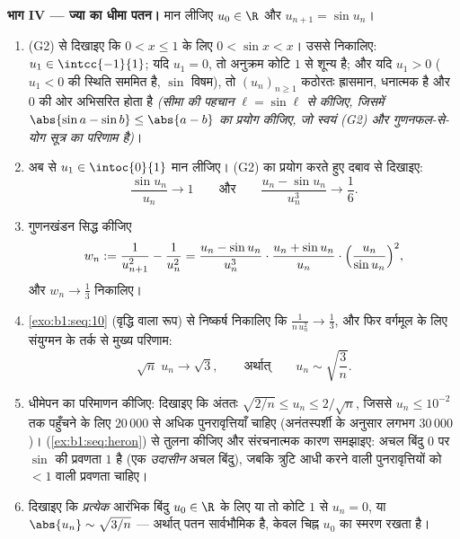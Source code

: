 \begin{problem}[{सप्ताहांत समस्या --- चेज़ारो--स्टोल्ज़ प्रमेय और $u_{n+1} = \sin
u_n$ के लिए अनंतस्पर्शी
$u_n \sim \sqrt{3/n}$}]
\medskip \noindent\textbf{भाग IV --- ज्या का धीमा पतन।} मान लीजिए $u_0 \in
\R$ और $u_{n+1} = \sin u_n$।
\begin{enumerate}[resume]
  \item (G2) से दिखाइए कि $0 < x \leq 1$ के लिए $0 < \sin x < x$। उससे
  निकालिए: $u_1 \in \intcc{-1}{1}$; यदि $u_1 = 0$, तो अनुक्रम कोटि $1$ से
  शून्य है; और यदि $u_1 > 0$ ($u_1 < 0$ की स्थिति सममित है, $\sin$ विषम), तो
  $(u_n)_{n \geq 1}$ कठोरतः ह्रासमान, धनात्मक है और $0$ की ओर अभिसरित होता
  है \emph{(सीमा की पहचान $\ell = \sin \ell$ से कीजिए, जिसमें $\abs{\sin a -
  \sin b} \leq \abs{a - b}$ का प्रयोग कीजिए, जो स्वयं (G2) और गुणनफल-से-योग
  सूत्र का परिणाम है)}।
  \item अब से $u_1 \in \intoc{0}{1}$ मान लीजिए। (G2) का प्रयोग करते हुए दबाव
  से दिखाइए:
        \[
        \frac{\sin u_n}{u_n} \to 1
        \qquad\text{और}\qquad
        \frac{u_n - \sin u_n}{u_n^{3}} \to \frac16 .
        \]
  \item गुणनखंडन सिद्ध कीजिए
        \[
        w_n := \frac{1}{u_{n+1}^{2}} - \frac{1}{u_n^{2}}
        = \frac{u_n - \sin u_n}{u_n^{3}} \cdot
        \frac{u_n + \sin u_n}{u_n} \cdot
        \Bigl(\frac{u_n}{\sin u_n}\Bigr)^{2},
        \]
        और $w_n \to \frac13$ निकालिए।
  \item \cref{exo:b1:seq:10} (वृद्धि वाला रूप) से निष्कर्ष निकालिए कि
  $\frac{1}{n\,u_n^{2}} \to \frac13$, और फिर वर्गमूल के लिए संयुग्मन के तर्क
  से मुख्य परिणाम:
        \[
        \sqrt n\;u_n \longrightarrow \sqrt 3 ,
        \qquad\text{अर्थात्}\qquad
        u_n \sim \sqrt{\frac 3n} .
        \]
  \item धीमेपन का परिमाणन कीजिए: दिखाइए कि अंततः $\sqrt{2/n} \leq u_n \leq
  2/\sqrt n$, जिससे $u_n \leq 10^{-2}$ तक पहुँचने के लिए $20\,000$ से अधिक
  पुनरावृत्तियाँ चाहिए (अनंतस्पर्शी के अनुसार लगभग $30\,000$)। 
  (\cref{ex:b1:seq:heron}) से तुलना कीजिए और संरचनात्मक कारण समझाइए: अचल
  बिंदु $0$ पर $\sin$ की प्रवणता $1$ है (एक \emph{उदासीन} अचल बिंदु), जबकि
  त्रुटि आधी करने वाली पुनरावृत्तियों को $< 1$  वाली प्रवणता चाहिए।
  \item दिखाइए कि \emph{प्रत्येक} आरंभिक बिंदु $u_0 \in \R$ के लिए या तो
  कोटि $1$ से $u_n = 0$, या $\abs{u_n} \sim \sqrt{3/n}$ --- अर्थात् पतन
  सार्वभौमिक है, केवल चिह्न $u_0$ का स्मरण रखता है।
\end{enumerate}


\end{problem}
